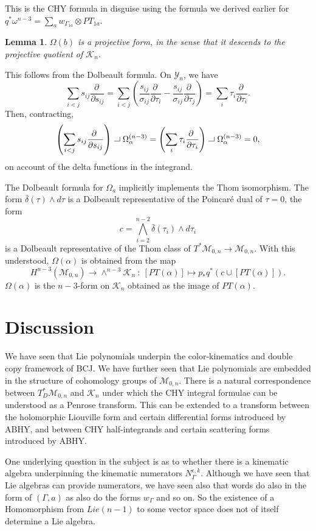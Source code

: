 \documentclass[11pt]{article}
\newcommand{\p}{\partial}
\newcommand{\cK}{\mathcal{K}}
\newcommand{\cM}{\mathcal{M}}
\newcommand{\cY}{\mathcal{Y}}
\newcommand{\1}{{\rm 1\hskip-0.25em I}}
\newcommand{\proof}{ \noindent {\bf Proof:} }
\newtheorem{lemma}{Lemma}[section]
\newcommand{\hook}{{\setlength{\unitlength}{10pt}		%
                  ~ \begin{picture}(.833,.8)
                   \put(-.18,.08){\line(1,0){.7}}
                   \put(.5,.08){\line(0,1){.5}}
                   \end{picture}}}
\begin{document}
This is the CHY formula in disguise using the formula we derived earlier for $q^*\omega^{n-3}=\sum_a w_{\Gamma_{1a}}\otimes PT_{1a}$.

\begin{lemma}
 $\Omega(b)$ is a projective form, in the sense that it descends to the projective quotient of $\cK_n$.
 \end{lemma}
 \proof This follows from the Dolbeault formula. On $\cY_n$, we have
$$
\sum_{i<j}s_{ij}\frac{\p~}{\p s_{ij}} = \sum_{i<j} \left(\frac{s_{ij}}{\sigma_{ij}}\frac{\p~}{\p\tau_i} - \frac{s_{ij}}{\sigma_{ij}}\frac{\p~}{\p\tau_j}\right) = \sum_i \tau_i \frac{\p~}{\p\tau_i}.
$$
Then, contracting,
$$
\left(\sum_{i<j}s_{ij}\frac{\p~}{\p s_{ij}}\right)\hook \Omega_{\alpha}^{(n-3)} = \left(\sum_i \tau_i \frac{\p~}{\p\tau_i}\right)\hook \Omega_{\alpha}^{(n-3)} = 0,
$$
on account of the delta functions in the integrand.

The Dolbeault formula for $\Omega_a$ implicitly implements the Thom isomorphism. The form $\bar\delta(\tau)\wedge d\tau$ is a Dolbeault representative of the Poincar\'e dual of $\tau = 0$, the form
$$
c = \bigwedge_{i=2}^{n-2} \bar\delta(\tau_i) \wedge d\tau_i
$$
is a Dolbeault representative of the Thom class of $T^*\cM_{0,n}\rightarrow \cM_{0,n}$. With this understood, $\Omega(\alpha)$ is obtained from the map
$$
H^{n-3}(\cM_{0,n}) \rightarrow \wedge^{n-3}\cK_n ~:~ [PT(\alpha)] \mapsto p_* q^* \left(c \cup [PT(\alpha)]\right).
$$
$\Omega(\alpha)$ is the $n-3$-form on $\cK_n$ obtained as the image of $PT(\alpha)$.


\section{Discussion}
We have seen that Lie polynomials underpin the color-kinematics and double copy framework of BCJ.  We have further seen that Lie polynomials are embedded in the structure of cohomology groups of  $\cM_{0,n}$. There is a natural correspondence between $T^*_D\cM_{0,n}$ and $\cK_n$ under which the CHY integral formulae can be understood as a Penrose transform.  This can be extended to a transform between the holomorphic Liouville form and certain differential forms introduced by ABHY, and between CHY half-integrands and certain scattering forms introduced by ABHY.

One underlying question in the subject is as to whether there is a kinematic algebra underpinning the kinematic numerators $N_\Gamma^{\epsilon,k}$.  Although we have seen that Lie algebras can provide numerators, we have seen also that words do also in the form of $(\Gamma,a)$ as also do the forms $w_\Gamma$ and so on.  So the existence of a Homomorphism from $Lie(n-1)$ to some vector space does not of itself determine a Lie algebra.  
\end{document}
